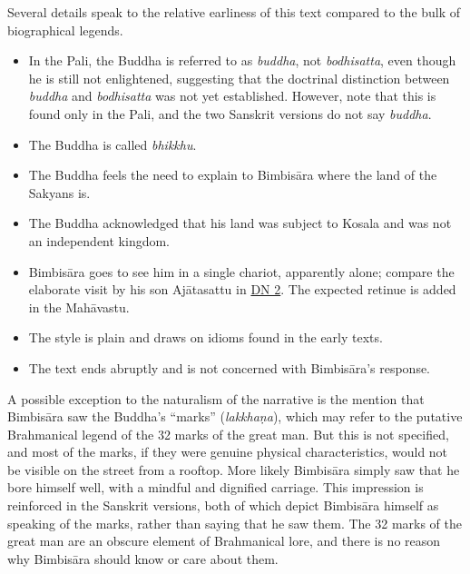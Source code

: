 \documentclass[12pt,openany]{book}%
\begin{document}
Several details speak to the relative earliness of this text compared to the bulk of biographical legends.

\begin{itemize}%
\item In the Pali, the Buddha is referred to as \textit{buddha}, not \textit{bodhisatta}, even though he is still not enlightened, suggesting that the doctrinal distinction between \textit{buddha} and \textit{bodhisatta} was not yet established. However, note that this is found only in the Pali, and the two Sanskrit versions do not say \textit{buddha}.%
\item The Buddha is called \textit{bhikkhu}.%
\item The Buddha feels the need to explain to \textsanskrit{Bimbisāra} where the land of the Sakyans is.%
\item The Buddha acknowledged that his land was subject to Kosala and was not an independent kingdom.%
\item \textsanskrit{Bimbisāra} goes to see him in a single chariot, apparently alone; compare the elaborate visit by his son \textsanskrit{Ajātasattu} in \href{https://suttacentral.net/dn2/en/sujato}{DN 2}. The expected retinue is added in the \textsanskrit{Mahāvastu}.%
\item The style is plain and draws on idioms found in the early texts.%
\item The text ends abruptly and is not concerned with \textsanskrit{Bimbisāra}’s response.%
\end{itemize}

A possible exception to the naturalism of the narrative is the mention that \textsanskrit{Bimbisāra} saw the Buddha’s “marks” (\textit{\textsanskrit{lakkhaṇa}}), which may refer to the putative Brahmanical legend of the 32 marks of the great man. But this is not specified, and most of the marks, if they were genuine physical characteristics, would not be visible on the street from a rooftop. More likely \textsanskrit{Bimbisāra} simply saw that he bore himself well, with a mindful and dignified carriage. This impression is reinforced in the Sanskrit versions, both of which depict \textsanskrit{Bimbisāra} himself as speaking of the marks, rather than saying that he saw them. The 32 marks of the great man are an obscure element of Brahmanical lore, and there is no reason why \textsanskrit{Bimbisāra} should know or care about them.
\end{document}
